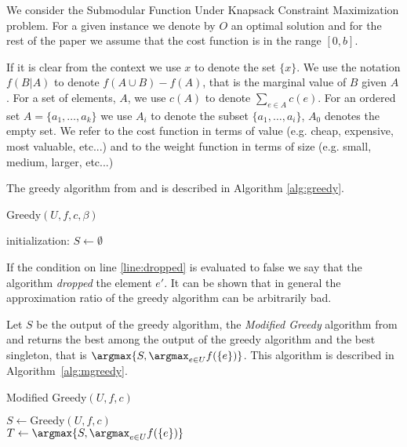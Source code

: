 We consider the Submodular Function Under
Knapsack Constraint Maximization problem.
For a given instance we denote by $O$ an optimal solution and for the rest of the 
paper we assume that the cost function is in the range $[0, b]$.
 
If it is clear from the context we use $x$ to denote the set $\{x\}$. 
We use the notation $f(B|A)$ to denote $f(A \cup B) - f(A)$, that is the marginal value of $B$
given $A$. 
For a set of elements, $A$, we use $c(A)$ to denote $\sum_{e \in A}c(e)$.
For an ordered set $A = \{a_1, \dots, a_k\}$ we use $A_i$ to denote the subset 
$\{a_1, \dots, a_i\}$, $A_0$ denotes the empty set.
We refer to the cost function in terms of value (e.g. cheap, expensive, most valuable, etc...) and 
to the weight function in terms of size (e.g. small, medium, larger, etc...) 

The greedy algorithm from \cite{khuller1999budgeted} and \cite{krause2005note}
is described in Algorithm \ref{alg:greedy}.

\begin{algorithm}[H]
\caption{Greedy$(U, f, c, \beta)$}
\label{alg:greedy}

initialization: $S \leftarrow \emptyset$
\\
\end{algorithm}
 
If the condition on line \ref{line:dropped} is evaluated to false we say that
the algorithm \emph{dropped} the element $e'$.
It can be shown that in general the approximation ratio of the greedy algorithm 
can be arbitrarily bad.

Let $S$ be the output of the greedy algorithm, the \emph{Modified Greedy} algorithm 
from \cite{khuller1999budgeted} and \cite{krause2005note} 
returns the best among the output of the greedy algorithm and the best singleton, 
that is $\argmax\{S, \displaystyle{\argmax_{e \in U}}f(\{e\})\}$.
This algorithm is described in Algorithm~\ref{alg:mgreedy}.  

\begin{algorithm}[H]
\caption{Modified Greedy$(U, f, c)$}
\label{alg:mgreedy}

$S \leftarrow \text{Greedy}(U, f, c)$
\\
$T \leftarrow \argmax\{S, \argmax_{e \in U}f(\{e\})\}$
\\
\end{algorithm}

